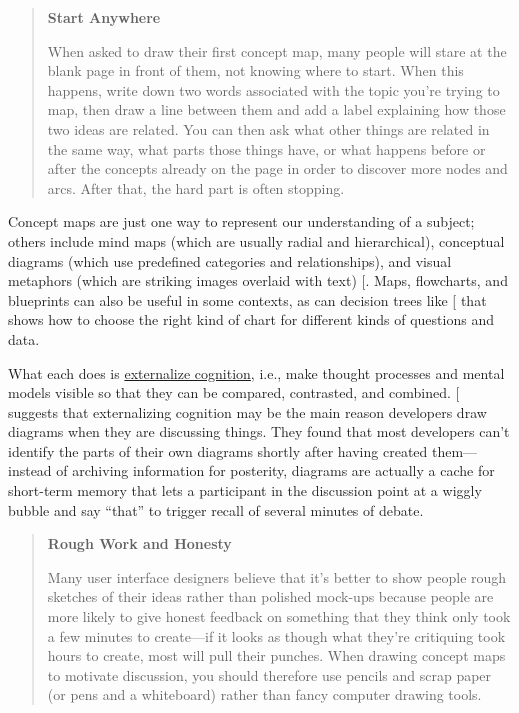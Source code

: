 \begin{quote}\setlength{\parindent}{0pt}
\textbf{Start Anywhere}

When asked to draw their first concept map, many people will stare at
the blank page in front of them, not knowing where to start. When this
happens, write down two words associated with the topic you're trying
to map, then draw a line between them and add a label explaining how
those two ideas are related. You can then ask what other things are
related in the same way, what parts those things have, or what happens
before or after the concepts already on the page in order to discover
more nodes and arcs. After that, the hard part is often stopping.
\end{quote}

Concept maps are just one way to represent our understanding of a
subject; others include mind maps (which are usually radial and
hierarchical), conceptual diagrams (which use predefined categories and
relationships), and visual metaphors (which are striking images overlaid
with text) {[}\protect[\hyperlink{b:Eppl2006}{Eppl2006}]{]}. Maps, flowcharts, and blueprints can also
be useful in some contexts, as can decision trees like
{[}\protect[\hyperlink{b:Abel2009}{Abel2009}]{]} that shows how to choose the right kind of chart for
different kinds of questions and data.

What each does is \protect\hyperlink{g:externalized-cognition}{externalize cognition},
i.e., make thought processes and mental models visible so that they
can be compared, contrasted, and combined. {[}\protect[\hyperlink{b:Cher2007}{Cher2007}]{]}
suggests that externalizing cognition may be the main reason
developers draw diagrams when they are discussing things. They found
that most developers can't identify the parts of their own diagrams
shortly after having created them---instead of archiving information
for posterity, diagrams are actually a cache for short-term memory
that lets a participant in the discussion point at a wiggly bubble and
say ``that'' to trigger recall of several minutes of debate.

\begin{quote}\setlength{\parindent}{0pt}
\textbf{Rough Work and Honesty}

Many user interface designers believe that it's better to show people
rough sketches of their ideas rather than polished mock-ups because
people are more likely to give honest feedback on something that they
think only took a few minutes to create---if it looks as though what
they're critiquing took hours to create, most will pull their punches.
When drawing concept maps to motivate discussion, you should therefore
use pencils and scrap paper (or pens and a whiteboard) rather than
fancy computer drawing tools.
\end{quote}

